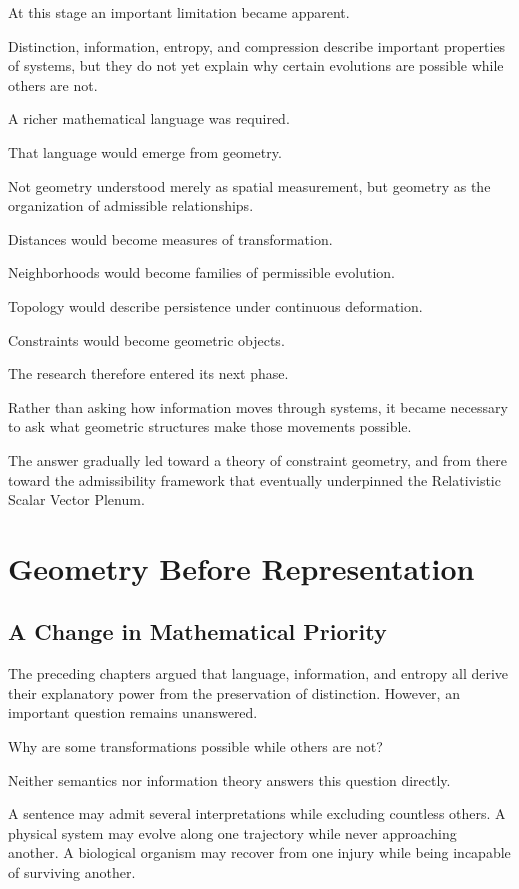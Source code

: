 \documentclass[11pt,oneside]{book}
\numberwithin{equation}{chapter}
\theoremstyle{definition}
\theoremstyle{plain}
\begin{document}
At this stage an important limitation became apparent.

Distinction, information, entropy, and compression describe important
properties of systems, but they do not yet explain why certain evolutions
are possible while others are not.

A richer mathematical language was required.

That language would emerge from geometry.

Not geometry understood merely as spatial measurement, but geometry as the
organization of admissible relationships.

Distances would become measures of transformation.

Neighborhoods would become families of permissible evolution.

Topology would describe persistence under continuous deformation.

Constraints would become geometric objects.

The research therefore entered its next phase.

Rather than asking how information moves through systems, it became
necessary to ask what geometric structures make those movements possible.

The answer gradually led toward a theory of constraint geometry, and from
there toward the admissibility framework that eventually underpinned the
Relativistic Scalar Vector Plenum.

\chapter{Geometry Before Representation}

\section{A Change in Mathematical Priority}

The preceding chapters argued that language, information, and entropy all
derive their explanatory power from the preservation of distinction.
However, an important question remains unanswered.

Why are some transformations possible while others are not?

Neither semantics nor information theory answers this question directly.

A sentence may admit several interpretations while excluding countless
others. A physical system may evolve along one trajectory while never
approaching another. A biological organism may recover from one injury while
being incapable of surviving another.
\end{document}

